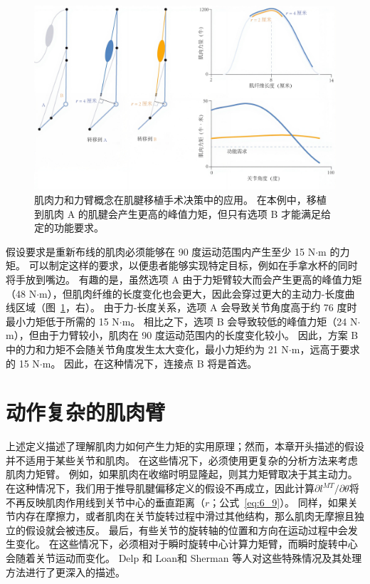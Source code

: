 \begin{figure}[!htb]
	\centering
	\includegraphics[width=1.0\linewidth]{chap6/6_14}
	\caption{肌肉力和力臂概念在肌腱移植手术决策中的应用。
		在本例中，移植到肌肉 A 的肌腱会产生更高的峰值力矩，但只有选项 B 才能满足给定的功能要求。 \label{fig:6_14}}
\end{figure}


假设要求是重新布线的肌肉必须能够在 90 度运动范围内产生至少 15 N$\cdot$m 的力矩。
可以制定这样的要求，以便患者能够实现特定目标，例如在手拿水杯的同时将手放到嘴边。
有趣的是，虽然选项 A 由于力矩臂较大而会产生更高的峰值力矩（48 N$\cdot$m），但肌肉纤维的长度变化也会更大，因此会穿过更大的主动力-长度曲线区域（图~\ref{fig:6_14}，右）。
由于力-长度关系，选项 A 会导致关节角度高于约 76 度时最小力矩低于所需的 15 N$\cdot$m。
相比之下，选项 B 会导致较低的峰值力矩（24 N$\cdot$m），但由于力臂较小，肌肉在 90 度运动范围内的长度变化较小。
因此，方案 B 中的力和力矩不会随关节角度发生太大变化，最小力矩约为 21 N$\cdot$m，远高于要求的 15 N$\cdot$m。
因此，在这种情况下，连接点 B 将是首选。



\section{动作复杂的肌肉臂}

上述定义描述了理解肌肉力如何产生力矩的实用原理；然而，本章开头描述的假设并不适用于某些关节和肌肉。
在这些情况下，必须使用更复杂的分析方法来考虑肌肉力矩臂。
例如，如果肌肉在收缩时明显隆起，则其力矩臂取决于其主动力。
在这种情况下，我们用于推导肌腱偏移定义的假设不再成立，因此计算$\partial l^{MT} / \partial \theta$将不再反映肌肉作用线到关节中心的垂直距离（$r$；公式~\ref{eq:6_9}）。
同样，如果关节内存在摩擦力，或者肌肉在关节旋转过程中滑过其他结构，那么肌肉无摩擦且独立的假设就会被违反。
最后，有些关节的旋转轴的位置和方向在运动过程中会发生变化。
在这些情况下，必须相对于瞬时旋转中心计算力矩臂，而瞬时旋转中心会随着关节运动而变化。 
Delp 和 Loan\cite{delp1995graphics}和 Sherman 等人\cite{sherman2013moment}对这些特殊情况及其处理方法进行了更深入的描述。


